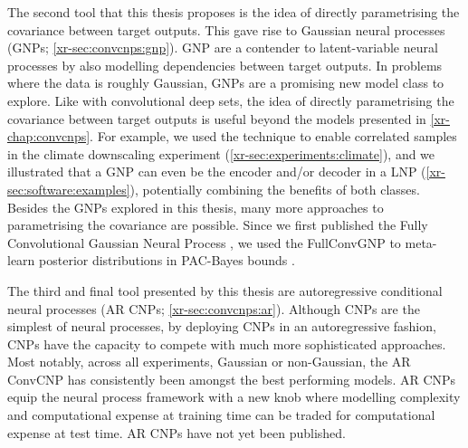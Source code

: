 \documentclass[12pt, twoside]{report}
\newcommand{\xrprefix}[1]{xr-#1}
\begin{document}
The second tool that this thesis proposes is the idea of directly parametrising the covariance between target outputs.
This gave rise to Gaussian neural processes (GNPs; \cref{\xrprefix{sec:convcnps:gnp}}).
GNP are a contender to latent-variable neural processes \parencite[LNPs;][]{Garnelo:2018:Neural_Processes}
by also modelling dependencies between target outputs.
In problems where the data is roughly Gaussian, GNPs are a promising new model class to explore.
Like with convolutional deep sets, the idea of directly parametrising the covariance between target outputs is useful beyond the models presented in \cref{\xrprefix{chap:convcnps}}.
For example, we used the technique to enable correlated samples in the climate downscaling experiment (\cref{\xrprefix{sec:experiments:climate}}), 
and we illustrated that a GNP can even be the encoder and/or decoder in a LNP (\cref{\xrprefix{sec:software:examples}}), potentially combining the benefits of both classes.
Besides the GNPs explored in this thesis,
many more approaches to parametrising the covariance are possible. 
Since we first published the Fully Convolutional Gaussian Neural Process \parencite[FullConvGNP;][]{Bruinsma:2021:The_Gaussian_Neural_Process,Markou:2022:Practical_Conditional_Neural_Processes_for_Tractable}, we used the FullConvGNP to meta-learn posterior distributions in PAC-Bayes bounds \parencite{Foong:2021:How_Tight_Can_PAC-Bayes_Be}.

The third and final tool presented by this thesis are autoregressive conditional neural processes (AR CNPs; \cref{\xrprefix{sec:convcnps:ar}}).
Although CNPs are the simplest of neural processes,
by deploying CNPs in an autoregressive fashion, CNPs have the capacity to compete with much more sophisticated approaches.
Most notably, across all experiments, Gaussian or non-Gaussian, the AR ConvCNP has consistently been amongst the best performing models.
AR CNPs equip the neural process framework with a new knob where modelling complexity and computational expense at training time can be traded for computational expense at test time.
AR CNPs have not yet been published.
\end{document}
